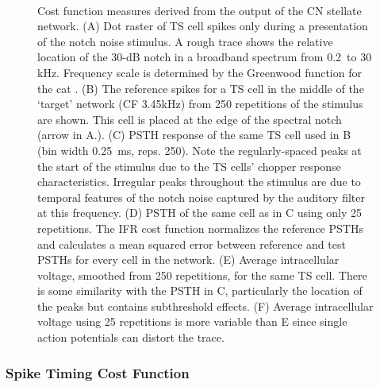 \begin{figure}[pt!]
  \begin{center}
    \\
    \vspace{0.1in}
\end{center}
\caption[Cost functions]{Cost function measures derived from the output of the CN
  stellate network. (A) Dot raster of TS cell spikes only during a
  presentation of the notch noise stimulus. A rough trace shows the
  relative location of the 30-dB notch in a broadband spectrum from
  0.2~to 30 kHz. Frequency scale is determined by the Greenwood
  function for the cat \citep{Greenwood:1990}. (B) The reference spikes
  for a TS cell in the middle of the `target' network (CF 3.45kHz)
  from 250 repetitions of the stimulus are shown. This cell is placed
  at the edge of the spectral notch (arrow in A.). (C) PSTH response
  of the same TS cell used in B (bin width 0.25~ms, reps. 250). Note
  the regularly-spaced peaks at the start of the stimulus due to the
  TS cells' chopper response characteristics. Irregular peaks
  throughout the stimulus are due to temporal features of the notch
  noise captured by the auditory filter at this frequency. (D) PSTH of
  the same cell as in C using only 25 repetitions. The IFR cost
  function normalizes the reference PSTHs and calculates a mean
  squared error between reference and test {PSTH}s for every cell in the
  network. (E) Average intracellular voltage, smoothed from 250
  repetitions, for the same TS cell. There is some similarity with the
  PSTH in C, particularly the location of the peaks but contains
  subthreshold effects. (F) Average intracellular voltage using 25
  repetitions is more variable than E since single action potentials
  can distort the trace.}
\label{fig:GA:Costfunctions}
\end{figure}
\clearpage

\subsubsection{Spike Timing Cost Function}\label{sec:GA:spike-timing-cost-fn}


